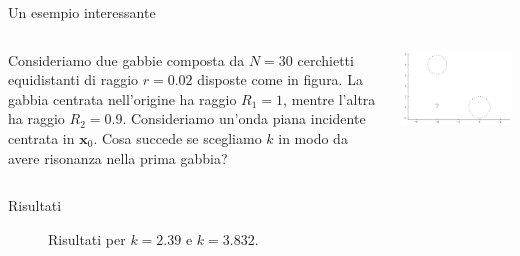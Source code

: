 \documentclass{beamer}
\newcommand{\bx}{{\mathbf x}}
\begin{document}
	\begin{frame}{Un esempio interessante}
		\begin{columns}
			\begin{column}{.5\textwidth}
				\begin{block}{}
					Consideriamo due gabbie composta da $N=30$ cerchietti equidistanti di raggio $r=0.02$ disposte come in figura. La gabbia centrata nell'origine ha raggio $R_1 = 1$, mentre l'altra ha raggio $R_2=0.9$. Consideriamo un'onda piana incidente centrata in $\bx_0$. Cosa succede se scegliamo $k$ in modo da avere risonanza nella prima gabbia?
				\end{block}
			\end{column}
			\begin{column}{.5\textwidth}
				\includegraphics[width=\textwidth]{figs/domain.png}
			\end{column}
		\end{columns}
	\end{frame}
	
	\begin{frame}{Risultati}
		\begin{figure}
			\caption{Risultati per $k=2.39$ e $k=3.832$.}
		\end{figure}
	\end{frame}
	
\end{document}
